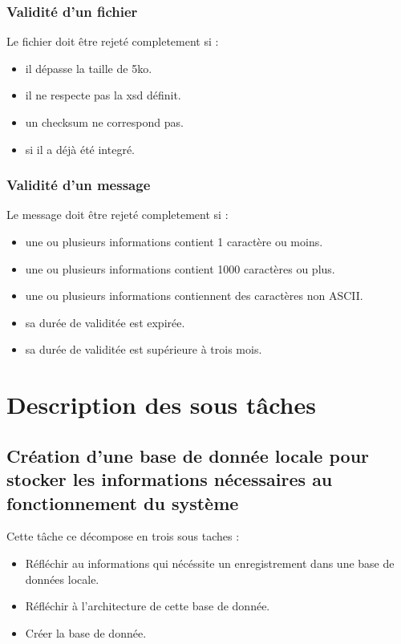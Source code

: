 \documentclass{article}
\begin{document}
\subsubsection{Validité d'un fichier}
Le fichier doit être rejeté completement si :
\begin{itemize}
  \item il dépasse la taille de 5ko.
  \item il ne respecte pas la xsd définit.
  \item un checksum ne correspond pas.
  \item si il a déjà été integré.
\end{itemize}

\subsubsection{Validité d'un message}
Le message doit être rejeté completement si :
\begin{itemize}
  \item une ou plusieurs informations contient 1 caractère ou moins.
  \item une ou plusieurs informations contient 1000 caractères ou plus.
  \item une ou plusieurs informations contiennent des caractères non ASCII.
  \item sa durée de validitée est expirée.
  \item sa durée de validitée est supérieure à trois mois.
\end{itemize}




\section{Description des sous tâches}

\subsection{Création d'une base de donnée locale pour stocker les informations nécessaires au fonctionnement du système}
Cette tâche ce décompose en trois sous taches :
\begin{itemize}
  \item Réfléchir au informations qui nécéssite un enregistrement dans une base de données locale.
  \item Réfléchir à l'architecture de cette base de donnée.
  \item Créer la base de donnée.
\end{itemize}
\end{document}
